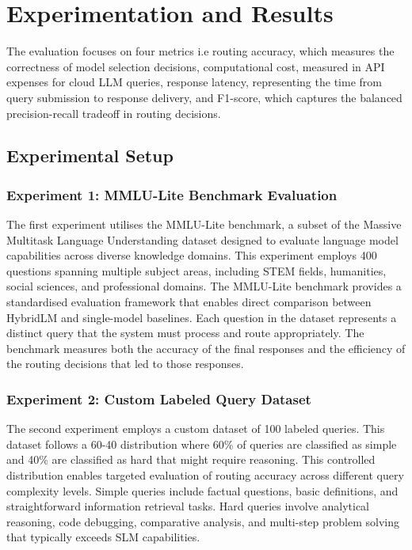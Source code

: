 \section{Experimentation and Results}
The evaluation focuses on four metrics i.e routing accuracy, which measures the correctness of model selection decisions, computational cost, measured in API expenses for cloud LLM queries, response latency, representing the time from query submission to response delivery, and F1-score,
which captures the balanced precision-recall tradeoff in routing decisions.

\subsection{Experimental Setup}

\subsubsection{Experiment 1: MMLU-Lite Benchmark Evaluation}
The first experiment utilises the MMLU-Lite benchmark, a subset of the Massive Multitask Language Understanding dataset designed to evaluate language model capabilities across diverse knowledge domains. This experiment employs 400 questions spanning multiple subject areas, including STEM fields, humanities, social sciences, and professional domains. The MMLU-Lite benchmark provides a standardised evaluation framework that enables direct comparison between HybridLM and single-model baselines. Each question in the dataset represents a distinct query that the system must process and route appropriately. The benchmark measures both the accuracy of the final responses and the efficiency of the routing decisions that led to those responses.

\subsubsection{Experiment 2: Custom Labeled Query Dataset}
The second experiment employs a custom dataset of 100 labeled queries. This dataset follows a 60-40 distribution where 60\% of queries are classified as simple and 40\% are classified as hard that might require reasoning. This controlled distribution enables targeted evaluation of routing accuracy across different query complexity levels. Simple queries include factual questions, basic definitions, and straightforward information retrieval tasks. Hard queries involve analytical reasoning, code debugging, comparative analysis, and multi-step problem solving that typically exceeds SLM capabilities.

